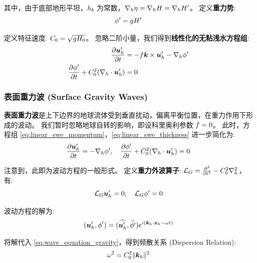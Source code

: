 其中，由于底部地形平坦，$h_b$ 为常数，$\nabla_h \eta = \nabla_h H = \nabla_h H^\prime$。
定义\textbf{重力势}:
\begin{equation}
    \phi^\prime = g H^\prime \label{eq:gravpotential}
\end{equation}

定义特征速度: $C_0 = \sqrt{g H_0}$。
忽略二阶小量，我们得到\textbf{线性化的无粘浅水方程组}:
\begin{align}
    \pde{\vel_h^\prime}{\timevar} &= -\coriolis \kvec \times \vel_h^\prime - \nabla_h \gravpotential^\prime \label{eq:linear_swe_momentum} \\
    \pde{\gravpotential^\prime}{\timevar} + C_0^2 (\nabla_h \cdot \vel_h^\prime) &= 0 \label{eq:linear_swe_thickness}
\end{align}

\subsubsection{表面重力波 (Surface Gravity Waves)}

\textbf{表面重力波}是上下边界的地球流体受到垂直扰动，偏离平衡位置，在重力作用下形成的波动。
我们暂时忽略地球自转的影响，即设科里奥利参数 $f = 0$。
此时，方程组 \eqref{eq:linear_swe_momentum}，\eqref{eq:linear_swe_thickness} 进一步简化为:
\begin{equation*}
    \pde{\vel_h^\prime}{\timevar} = -\nabla_h \gravpotential^\prime, \quad \pde{\gravpotential^\prime}{\timevar} + C_0^2 (\nabla_h \cdot \vel_h^\prime) = 0
\end{equation*}

注意到，此即为波动方程的一般形式。
定义\textbf{重力外波算子}: $\opG = \pde[2]{}{\timevar} - C_0^2 \nabla_h^2$，有:
\begin{equation}
    \mathcal{L}_G \bm{u}_h^\prime = 0, \quad \mathcal{L}_G \phi^\prime = 0
    \label{eq:wave_equation_gravity}
\end{equation}

波动方程的解为:
\begin{equation}
    (\bm{u}_h^\prime, \phi^\prime) = (\widehat{\bm{u}_h^\prime}, \widehat{\phi^\prime}) e^{i (\bm{k}_h \cdot \bm{x}_h - \omega t)} \label{eq:wave_solution_gravity}
\end{equation}

将解代入 \eqref{eq:wave_equation_gravity}，得到频散关系 (Dispersion Relation):
\begin{equation}
    \omega^2 = C_0^2 \lVert \bm{k}_h \rVert^2
    \label{eq:dispersion_relation_gravity}
\end{equation}


